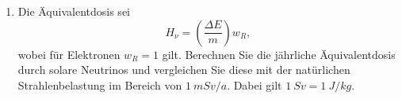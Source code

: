 \documentclass[11pt,a4paper]{scrartcl}
\begin{document}
\begin{enumerate}[label=(\alph*)]
            \begin{calculationbox}
                Die typische Neutrinoenergie ist
                \[
                    E_\nu=\SI{100}{keV}.
                \]
                Im Mittel wird davon die Hälfte auf das Elektron übertragen:
                \[
                    E_e=\frac{1}{2}E_\nu=\SI{50}{keV}.
                \]

                \begin{calculationbox}
                    In Joule ist das
                    \begin{align*}
                        E_e&=50\cdot10^3\,\si{eV}\cdot1.602\cdot10^{-19}\,\frac{\si{J}}{\si{eV}}\\
                        &=8.01\cdot10^{-15}\,\si{J}.
                    \end{align*}
                \end{calculationbox}

                \begin{calculationbox}
                    Aus Teil (c) hatten wir ungefähr
                    \[
                        N_{\mathrm{Jahr}}=83.9
                    \]
                    Reaktionen pro Jahr. Daher ist die pro Jahr im Körper abgegebene Energie
                    \begin{align*}
                        \Delta E_{\mathrm{Jahr}}
                        &=N_{\mathrm{Jahr}}E_e\\
                        &=83.9\cdot8.01\cdot10^{-15}\,\si{J}\\
                        &=6.72\cdot10^{-13}\,\si{J}.
                    \end{align*}
                \end{calculationbox}
            \end{calculationbox}

            \begin{answerbox}
                Durch diese Elektronen wird pro Jahr ungefähr die Energie
                \[
                    \boxed{\Delta E_{\mathrm{Jahr}}=6.72\cdot10^{-13}\,\si{J}}
                \]
                im Körper abgegeben.
            \end{answerbox}

        \item
            Die Äquivalentdosis sei
            \[
                H_\nu=\left(\frac{\Delta E}{m}\right)w_R,
            \]
            wobei für Elektronen $w_R=1$ gilt. Berechnen Sie die jährliche Äquivalentdosis
            durch solare Neutrinos und vergleichen Sie diese mit der natürlichen Strahlenbelastung
            im Bereich von \(\SI{1}{mSv/a}\). Dabei gilt \(\SI{1}{Sv}=\SI{1}{J/kg}\).


\end{enumerate}
\end{document}
